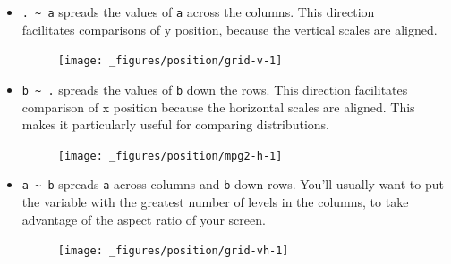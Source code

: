 \begin{itemize}
\item
  \texttt{.\ \textasciitilde{}\ a} spreads the values of \texttt{a}
  across the columns. This direction\\
   facilitates comparisons of y position, because the vertical scales
  are aligned.

\begin{Shaded}
\begin{Highlighting}[]
\StringTok{ }\StringTok{ }
\end{Highlighting}
\end{Shaded}

  \begin{figure}[H]
    \centering
    \texttt{[image: \_figures/position/grid-v-1]}
  \end{figure}
\item
  \texttt{b\ \textasciitilde{}\ .} spreads the values of \texttt{b} down
  the rows. This direction facilitates comparison of x position because
  the horizontal scales are aligned. This makes it particularly useful
  for comparing distributions.

\begin{Shaded}
\begin{Highlighting}[]
\StringTok{ }\StringTok{ }
\end{Highlighting}
\end{Shaded}

  \begin{figure}[H]
    \centering
    \texttt{[image: \_figures/position/mpg2-h-1]}
  \end{figure}
\item
  \texttt{a\ \textasciitilde{}\ b} spreads \texttt{a} across columns and
  \texttt{b} down rows. You'll usually want to put the variable with the
  greatest number of levels in the columns, to take advantage of the
  aspect ratio of your screen.

\begin{Shaded}
\begin{Highlighting}[]
\StringTok{ }\StringTok{ }
\end{Highlighting}
\end{Shaded}

  \begin{figure}[H]
    \centering
    \texttt{[image: \_figures/position/grid-vh-1]}
  \end{figure}
\end{itemize}

